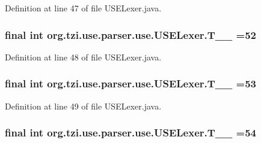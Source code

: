 Definition at line 47 of file U\-S\-E\-Lexer.\-java.

\hypertarget{classorg_1_1tzi_1_1use_1_1parser_1_1use_1_1_u_s_e_lexer_a1c4eeecf9a67a88e585704e20bf8bbba}{
\subsubsection[{T\-\_\-\-\_\-52}]{\setlength{\rightskip}{0pt plus 5cm}final int org.\-tzi.\-use.\-parser.\-use.\-U\-S\-E\-Lexer.\-T\-\_\-\-\_ =52\hspace{0.3cm}{\ttfamily [static]}}}\label{classorg_1_1tzi_1_1use_1_1parser_1_1use_1_1_u_s_e_lexer_a1c4eeecf9a67a88e585704e20bf8bbba}


Definition at line 48 of file U\-S\-E\-Lexer.\-java.

\hypertarget{classorg_1_1tzi_1_1use_1_1parser_1_1use_1_1_u_s_e_lexer_ac97bc7745930ee1c9246f62fb893c2e7}{
\subsubsection[{T\-\_\-\-\_\-53}]{\setlength{\rightskip}{0pt plus 5cm}final int org.\-tzi.\-use.\-parser.\-use.\-U\-S\-E\-Lexer.\-T\-\_\-\-\_ =53\hspace{0.3cm}{\ttfamily [static]}}}\label{classorg_1_1tzi_1_1use_1_1parser_1_1use_1_1_u_s_e_lexer_ac97bc7745930ee1c9246f62fb893c2e7}


Definition at line 49 of file U\-S\-E\-Lexer.\-java.

\hypertarget{classorg_1_1tzi_1_1use_1_1parser_1_1use_1_1_u_s_e_lexer_a1e72380a3a4122dd8f64d0965be11f5e}{
\subsubsection[{T\-\_\-\-\_\-54}]{\setlength{\rightskip}{0pt plus 5cm}final int org.\-tzi.\-use.\-parser.\-use.\-U\-S\-E\-Lexer.\-T\-\_\-\-\_ =54\hspace{0.3cm}{\ttfamily [static]}}}\label{classorg_1_1tzi_1_1use_1_1parser_1_1use_1_1_u_s_e_lexer_a1e72380a3a4122dd8f64d0965be11f5e}


